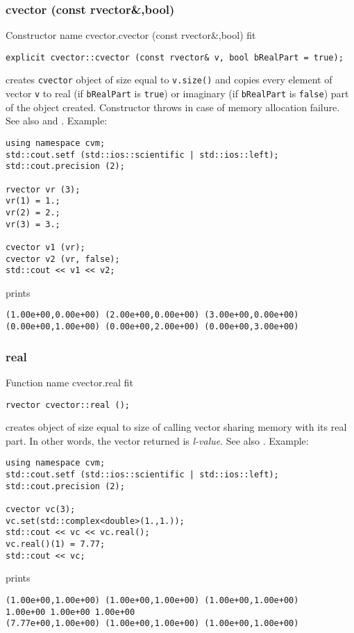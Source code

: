 \subsubsection{cvector (const rvector\&,bool)}
Constructor%
\pdfdest name {cvector.cvector (const rvector&,bool)} fit
\begin{verbatim}
explicit cvector::cvector (const rvector& v, bool bRealPart = true);
\end{verbatim}
creates  \verb"cvector" object
of size equal to \verb"v.size()" and copies every
element of  vector \verb"v"
to  real (if \verb"bRealPart" is \verb"true")
or imaginary (if \verb"bRealPart" is \verb"false")
part of the object created.
Constructor throws  
in case of memory allocation failure.
See also  and .
Example:
\begin{Verbatim}
using namespace cvm;
std::cout.setf (std::ios::scientific | std::ios::left);
std::cout.precision (2);

rvector vr (3);
vr(1) = 1.;
vr(2) = 2.;
vr(3) = 3.;

cvector v1 (vr);
cvector v2 (vr, false);
std::cout << v1 << v2;
\end{Verbatim}
prints
\begin{Verbatim}
(1.00e+00,0.00e+00) (2.00e+00,0.00e+00) (3.00e+00,0.00e+00)
(0.00e+00,1.00e+00) (0.00e+00,2.00e+00) (0.00e+00,3.00e+00)
\end{Verbatim}
\newpage


\subsubsection{real}
Function%
\pdfdest name {cvector.real} fit
\begin{verbatim}
rvector cvector::real ();
\end{verbatim}
creates   object
of size equal to  size of  calling vector
sharing  memory with its real part.
In other words, the vector returned is  \emph{l-value}.
See also .
Example:
\begin{Verbatim}
using namespace cvm;
std::cout.setf (std::ios::scientific | std::ios::left);
std::cout.precision (2);

cvector vc(3);
vc.set(std::complex<double>(1.,1.));
std::cout << vc << vc.real();
vc.real()(1) = 7.77;
std::cout << vc;
\end{Verbatim}
prints
\begin{Verbatim}
(1.00e+00,1.00e+00) (1.00e+00,1.00e+00) (1.00e+00,1.00e+00)
1.00e+00 1.00e+00 1.00e+00
(7.77e+00,1.00e+00) (1.00e+00,1.00e+00) (1.00e+00,1.00e+00)
\end{Verbatim}
\newpage



